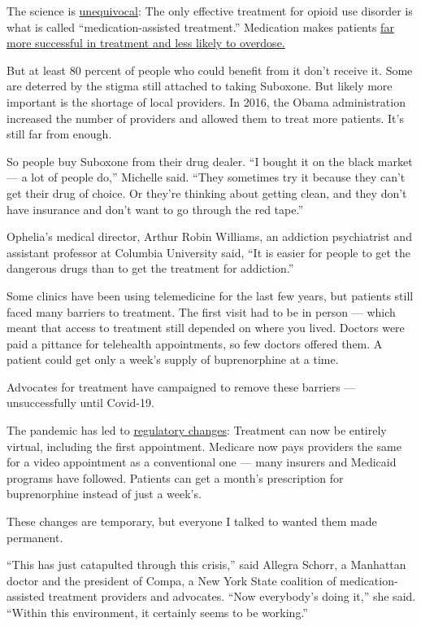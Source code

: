 The science is
\href{https://www.ncbi.nlm.nih.gov/books/NBK534504/}{unequivocal}: The
only effective treatment for opioid use disorder is what is called
``medication-assisted treatment.'' Medication makes patients
\href{https://www.ncbi.nlm.nih.gov/books/NBK534504/}{far more successful
in treatment and less likely to overdose.}

But at least 80 percent of people who could benefit from it don't
receive it. Some are deterred by the stigma still attached to taking
Suboxone. But likely more important is the shortage of local providers.
In 2016, the Obama administration increased the number of providers and
allowed them to treat more patients. It's still far from enough.

So people buy Suboxone from their drug dealer. ``I bought it on the
black market --- a lot of people do,'' Michelle said. ``They sometimes
try it because they can't get their drug of choice. Or they're thinking
about getting clean, and they don't have insurance and don't want to go
through the red tape.''

Ophelia's medical director, Arthur Robin Williams, an addiction
psychiatrist and assistant professor at Columbia University said, ``It
is easier for people to get the dangerous drugs than to get the
treatment for addiction.''

Some clinics have been using telemedicine for the last few years, but
patients still faced many barriers to treatment. The first visit had to
be in person --- which meant that access to treatment still depended on
where you lived. Doctors were paid a pittance for telehealth
appointments, so few doctors offered them. A patient could get only a
week's supply of buprenorphine at a time.

Advocates for treatment have campaigned to remove these barriers ---
unsuccessfully until Covid-19.

The pandemic has led to
\href{https://www.samhsa.gov/sites/default/files/faqs-for-oud-prescribing-and-dispensing.pdf}{regulatory
changes}: Treatment can now be entirely virtual, including the first
appointment. Medicare now pays providers the same for a video
appointment as a conventional one --- many insurers and Medicaid
programs have followed. Patients can get a month's prescription for
buprenorphine instead of just a week's.

These changes are temporary, but everyone I talked to wanted them made
permanent.

``This has just catapulted through this crisis,'' said Allegra Schorr, a
Manhattan doctor and the president of Compa, a New York State coalition
of medication-assisted treatment providers and advocates. ``Now
everybody's doing it,'' she said. ``Within this environment, it
certainly seems to be working.''

